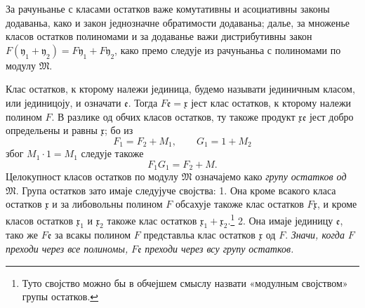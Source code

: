 ﻿\documentclass[11pt]{article}
\providecommand{\mM}{\mathfrak M}
\providecommand{\mx}{\mathfrak x}
\providecommand{\my}{\mathfrak y}
\providecommand{\me}{\mathfrak e}
\begin{document}
За рачуньанье с класами остатков важе комутативны и асоциативны законы додаваньа, како и закон једнозначне обратимости додаваньа; далье, за множенье класов остатков полиномами и за додаванье важи дистрибутивны закон \(F(\my_1+\my_2)=F\my_1+F\my_2\), како премо следује из рачуньаньа с полиномами по модулу \(\mM\).

Клас остатков, к кторому належи јединица, будемо называти јединичным класом, или јединицоју, и означати \(\me\). Тогда \(F\me=\mx\) јест клас остатков, к кторому належи полином \(F\). В разлике од обчих класов остатков, ту такоже продукт \(\mx\me\) јест добро определьены и равны \(\mx\); бо из
\[
 F_1=F_2+M_1,\qquad G_1=1+M_2
\]
због \(M_1\cdot1=M_1\) следује такоже
\[
 F_1G_1=F_2+M.
\]
Целокупност класов остатков по модулу \(\mM\) означајемо како \textit{групу остатков од} \(\mM\). Група остатков зато имаје следујуче својства: 1. Она кроме всакого класа остатков \(\mx\) и за либовольны полином \(F\) обсахује такоже клас остатков \(F\mx\), и кроме класов остатков \(\mx_1\) и \(\mx_2\) такоже клас остатков \(\mx_1+\mx_2\).\footnote{Туто својство можно бы в обчејшем смыслу назвати «модулным својством» групы остатков.} 2. Она имаје јединицу \(\me\), тако же \(F\me\) за всакы полином \(F\) представльа клас остатков \(\mx\) од \(F\). \textit{Значи, когда} \(F\) \textit{преходи через все полиномы,} \(F\me\) \textit{преходи через всу групу остатков.}
\end{document}
